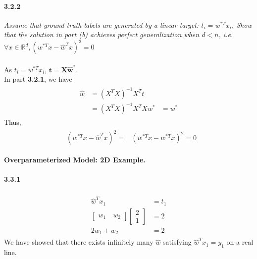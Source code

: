 \documentclass{myhw}
\begin{document}
\begin{homeworkProblem}
\begin{homeworkSection}
\paragraph{3.2.2} \emph{Assume that ground truth labels are generated by a linear target: $t_i = w^{*T} x_i$. Show that the solution in part (b) achieves perfect generalization when $d < n$, i.e. $\forall x \in \mathbb{R}^d, (w^{*T} x - \hat{w}^T x)^2 = 0$} \\ 
\\
As $t_i = w^{*T}x_i$, $\textbf{t} = \textbf{X}\hat{\textbf{w}}^*$. \\In part \textbf{3.2.1}, we have
\begin{gather*}
\begin{aligned}
\hat{w} &= (X^TX)^{-1} X^Tt \\
&= (X^TX)^{-1} X^T X w^* 
&= w^*
\end{aligned}
\end{gather*}
Thus,
\begin{gather*}
\begin{aligned}
&(w^{*T} x - \hat{w}^T x)^2  = &(w^{*T} x - w^{*T} x)^2 = 0
\end{aligned}
\end{gather*}
\end{homeworkSection}
\begin{homeworkSection}
\textbf{Overparameterized Model: 2D Example.}
\paragraph{3.3.1}
\begin{gather*}
\begin{aligned}
\hat{w}^T x_1 &= t_1 \\
\begin{bmatrix} w_1 \quad w_2 \end{bmatrix} \begin{bmatrix} 2 \\ 1 \end{bmatrix} &= 2 \\
2w_1 + w_2 &= 2
\end{aligned}
\end{gather*}
We have showed that there exists infinitely many $\hat{w}$ satisfying $\hat{w}^T x_1 = y_1$ on a real line.

\end{homeworkSection}
\end{homeworkProblem}
\end{document}
